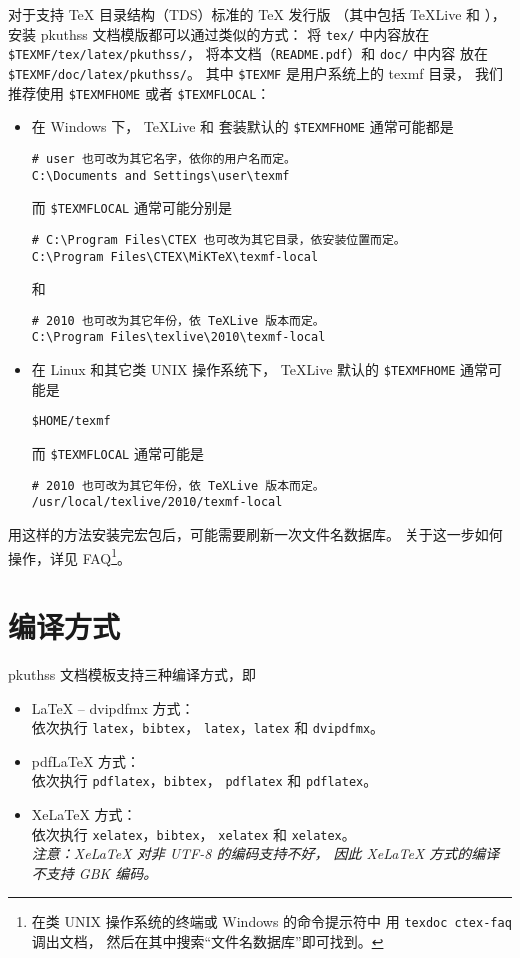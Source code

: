 	对于支持 \TeX{} 目录结构（TDS）标准的 \TeX{} 发行版%
	（其中包括 \TeX{}Live 和 \CTeX{}），
	安装 pkuthss 文档模版都可以通过类似的方式：
	将 \verb|tex/| 中内容放在 \verb|$TEXMF/tex/latex/pkuthss/|，
	将本文档（\verb|README.pdf|）和 \verb|doc/| 中内容%
	放在 \verb|$TEXMF/doc/latex/pkuthss/|。
	其中 \verb|$TEXMF| 是用户系统上的 texmf 目录，
	我们推荐使用 \verb|$TEXMFHOME| 或者 \verb|$TEXMFLOCAL|：
	\begin{itemize}
		\item 在 Windows 下，
			\TeX{}Live 和 \CTeX{} 套装默认的 \verb|$TEXMFHOME| %
			通常可能都是
\begin{Verbatim}[frame=single]
# user 也可改为其它名字，依你的用户名而定。
C:\Documents and Settings\user\texmf
\end{Verbatim}
			而 \verb|$TEXMFLOCAL| 通常可能分别是
\begin{Verbatim}[frame=single]
# C:\Program Files\CTEX 也可改为其它目录，依安装位置而定。
C:\Program Files\CTEX\MiKTeX\texmf-local
\end{Verbatim}
			和
\begin{Verbatim}[frame=single]
# 2010 也可改为其它年份，依 TeXLive 版本而定。
C:\Program Files\texlive\2010\texmf-local
\end{Verbatim}
		\item 在 Linux 和其它类 UNIX 操作系统下，
			\TeX{}Live 默认的 \verb|$TEXMFHOME| 通常可能是
\begin{Verbatim}[frame=single]
$HOME/texmf
\end{Verbatim}
			而 \verb|$TEXMFLOCAL| 通常可能是
\begin{Verbatim}[frame=single]
# 2010 也可改为其它年份，依 TeXLive 版本而定。
/usr/local/texlive/2010/texmf-local
\end{Verbatim}
	\end{itemize}

	用这样的方法安装完宏包后，可能需要刷新一次文件名数据库。
	关于这一步如何操作，详见 \CTeX{} FAQ\cite{ctex-faq}\footnote{%
		在类 UNIX 操作系统的终端或 Windows 的命令提示符中%
		用 \texttt{texdoc ctex-faq} 调出文档，
		然后在其中搜索“文件名数据库”即可找到。%
	}。

	\section{编译方式}

	pkuthss 文档模板支持三种编译方式，即
	\begin{itemize}
		\item \LaTeX{} -- dvipdfmx 方式：\\
			依次执行 \verb|latex|，\verb|bibtex|，%
			\verb|latex|，\verb|latex| 和 \verb|dvipdfmx|。
		\item pdf\LaTeX{} 方式：\\
			依次执行 \verb|pdflatex|，\verb|bibtex|，%
			\verb|pdflatex| 和 \verb|pdflatex|。
		\item Xe\LaTeX{} 方式：\\
			依次执行 \verb|xelatex|，\verb|bibtex|，%
			\verb|xelatex| 和 \verb|xelatex|。\\
			\emph{%
				注意：Xe\LaTeX{} 对非 UTF-8 的编码支持不好，
				因此 Xe\LaTeX{} 方式的编译不支持 GBK 编码。
			}
	\end{itemize}

